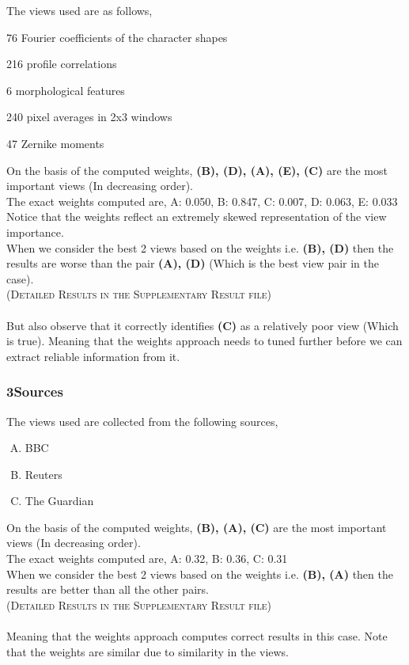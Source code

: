 \documentclass[a4paper]{article}
\begin{document}
	The views used are as follows,
	\vspace{-0.2cm}
	\begin{enumerate}[(A)]
	\setlength\itemsep{-0.05em}
	{
		\item 76 Fourier coefficients of the character shapes
		\item 216 profile correlations
		\item 6 morphological features
		\item 240 pixel averages in 2x3 windows 
		\item 47 Zernike moments
	}\end{enumerate}		

	On the basis of the computed weights, \textbf{(B), (D), (A), (E), (C)} are the most important views (In decreasing order).\\
	The exact weights computed are,	\textsc{A: 0.050, B: 0.847, C: 0.007, D: 0.063, E: 0.033}\\
	Notice that the weights reflect an extremely skewed representation of the view importance. \\
	When we consider the best 2 views based on the weights i.e. \textbf{(B), (D)} then the results are worse than the pair \textbf{(A), (D)} (Which is the best view pair in the case).\\
	\null \hfill {\footnotesize{\textsc{(Detailed Results in the Supplementary Result file)}}}\\\\
	But also observe that it correctly identifies \textbf{(C)} as a relatively poor view (Which is true). Meaning that the weights approach needs to tuned further before we can extract reliable information from it.

	\subsubsection{3Sources}
	
	The views used are collected from the following sources,
	\vspace{-0.2cm}
	\begin{enumerate}[(A)]
	\setlength\itemsep{-0.05em}
		\item BBC
		\item Reuters
		\item The Guardian
	\end{enumerate}		

	On the basis of the computed weights, \textbf{(B), (A), (C)} are the most important views (In decreasing order).\\
	The exact weights computed are,	\textsc{A: 0.32, B:	0.36, C: 0.31}\\
	When we consider the best 2 views based on the weights i.e. \textbf{(B), (A)} then the results are better than all the other pairs.\\
	\null \hfill {\footnotesize{\textsc{(Detailed Results in the Supplementary Result file)}}}\\ \\
	Meaning that the weights approach computes correct results in this case. Note that the weights are similar due to similarity in the views.
	
\end{document}
